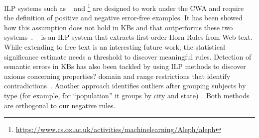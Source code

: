 ILP systems such as ~\cite{dehaspe1999discovery} and \footnote{\url{https://www.cs.ox.ac.uk/activities/machinelearning/Aleph/aleph}} are designed to work under the CWA and require the definition of positive and negative error-free examples.
It has been showed how this assumption does not hold in KBs and that  \amie outperforms these two systems~\cite{galarraga2015fast}. 
~\cite{schoenmackers2010learning} is an ILP system that extracts first-order Horn Rules 
from Web text. While extending \krd to free text %
is an interesting future work, the statistical significance estimate needs a threshold to discover meaningful rules. 
Detection of semantic errors in KBs has also been tackled by using ILP methods to discover axioms concerning properties? domain and
range restrictions that identify contradictions~\cite{Topper:2012}. Another approach identifies outliers after grouping subjects by type (for example, for ``population'' it groups by city and state)~\cite{Wienand2014}. Both methods are orthogonal to our negative rules.



